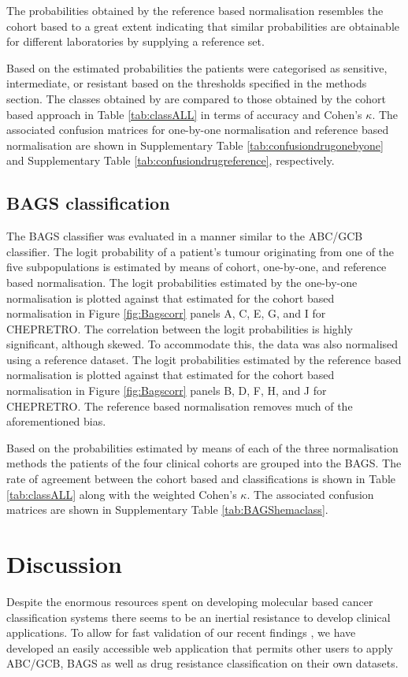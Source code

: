 \documentclass{article}
\begin{document}
The probabilities obtained by the reference based normalisation resembles the cohort based to a great extent indicating that similar probabilities are obtainable for different laboratories by supplying a reference set.

Based on the estimated probabilities the patients were categorised as sensitive, intermediate, or resistant based on the thresholds specified in the methods section.
The classes obtained by \hemaClass{} are compared to those obtained by the cohort based approach in Table \ref{tab:classALL} in terms of accuracy and Cohen's $\kappa$.
The associated confusion matrices for one-by-one normalisation and reference based normalisation are shown in Supplementary Table \ref{tab:confusiondrugonebyone} and Supplementary Table \ref{tab:confusiondrugreference}, respectively.

\subsection{BAGS classification}

The BAGS classifier was evaluated in a manner similar to the ABC/GCB classifier.
The logit probability of a patient's tumour originating from one of the five subpopulations is estimated by means of cohort, one-by-one, and reference based normalisation.
The logit probabilities estimated by the one-by-one normalisation is plotted against that estimated for the cohort based normalisation in Figure \ref{fig:Bagscorr} panels A, C, E, G, and I for CHEPRETRO.
The correlation between the logit probabilities is highly significant, although skewed.
To accommodate this, the data was also normalised using a reference dataset.
The logit probabilities estimated by the reference based normalisation is plotted against that estimated for the cohort based normalisation in Figure \ref{fig:Bagscorr} panels B, D, F, H, and J for CHEPRETRO.
The reference based normalisation removes much of the aforementioned bias.

Based on the probabilities estimated by means of each of the three normalisation methods the patients of the four clinical cohorts are grouped into the BAGS.
The rate of agreement between the cohort based and \hemaClass{} classifications is shown in Table \ref{tab:classALL} along with the weighted Cohen's $\kappa$.
The associated confusion matrices are shown in Supplementary Table \ref{tab:BAGShemaclass}.




\section{Discussion}
Despite the enormous resources spent on developing molecular based cancer classification systems there seems to be an inertial resistance to develop clinical applications.
To allow for fast validation of our recent findings \citep{DybkaerBoegsted2015, Falgreen2015}, we have developed an easily accessible web application that permits other users to apply ABC/GCB, BAGS as well as drug resistance classification on their own datasets.
\end{document}
